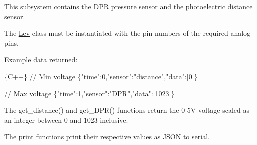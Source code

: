 This subsystem contains the D\+PR pressure sensor and the photoelectric distance sensor.

The \hyperlink{class_lev}{Lev} class must be instantiated with the pin numbers of the required analog pins.

Example data returned\+: 
\begin{DoxyCode}
\{C++\}
// Min voltage
\{"time":0,"sensor":"distance","data":[0]\}

// Max voltage
\{"time":1,"sensor":"DPR","data":[1023]\}
\end{DoxyCode}


The {\ttfamily get\+\_\+distance()} and {\ttfamily get\+\_\+\+D\+P\+R()} functions return the 0-\/5V voltage scaled as an integer between 0 and 1023 inclusive.

The {\ttfamily print} functions print their respective values as J\+S\+ON to serial. 